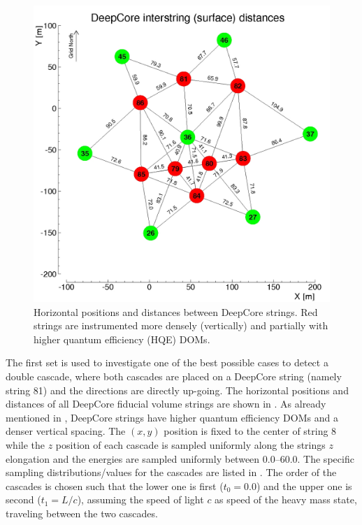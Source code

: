 \begin{figure}[h]
    \centering
    \includegraphics{figures/icecube_deepcore/deepcore_surface_distances.jpg}
    \caption[xx]{Horizontal positions and distances between DeepCore strings. Red strings are instrumented more densely (vertically) and partially with higher quantum efficiency (HQE) DOMs.}
\end{figure}

The first set is used to investigate one of the best possible cases to detect a double cascade, where both cascades are placed on a DeepCore string (namely string 81) and the directions are directly up-going. The horizontal positions and distances of all DeepCore fiducial volume strings are shown in . As already mentioned in , DeepCore strings have higher quantum efficiency DOMs and a denser vertical spacing. The $(x,y)$ position is fixed to the center of string 8 while the $z$ position of each cascade is sampled uniformly along the strings $z$ elongation and the energies are sampled uniformly between \SIrange{0.0}{60.0}{\gev}. The specific sampling distributions/values for the cascades are listed in . The order of the cascades is chosen such that the lower one is first ($t_0=0.0$) and the upper one is second ($t_1=L/c$), assuming the speed of light $c$ as speed of the heavy mass state, traveling between the two cascades.

